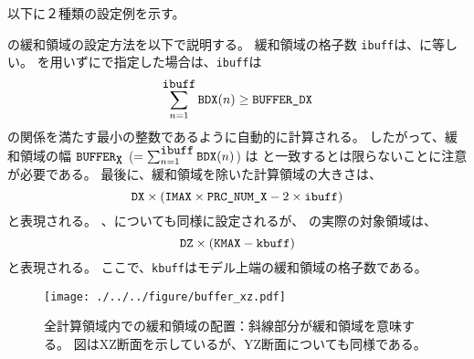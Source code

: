以下に２種類の設定例を示す。
%
%

{\XDIR}の緩和領域の設定方法を以下で説明する。
緩和領域の格子数 \verb|ibuff|は、に等しい。
を用いずにで指定した場合は、\verb|ibuff|は
\[
\sum_{n=1}^{\verb|ibuff|} \verb|BDX|(n) \ge \nmitemeq{BUFFER_DX} \nonumber
\]
の関係を満たす最小の整数であるように自動的に計算される。
したがって、緩和領域の幅 $\verb|BUFFER|_{\verb|X|}$ ($= \sum_{n=1}^{\verb|ibuff|} \verb|BDX|(n)$)
は  と一致するとは限らないことに注意が必要である。
最後に、緩和領域を除いた計算領域の大きさは、
\[
\nmitemeq{DX} \times ( \nmitemeq{IMAX} \times \nmitemeq{PRC_NUM_X} - 2 \times \verb|ibuff| )
\]
と表現される。
{\YDIR}、{\ZDIR}についても同様に設定されるが、
{\ZDIR} の実際の対象領域は、
\[
\nmitemeq{DZ} \times ( \nmitemeq{KMAX} - \verb|kbuff| )
\]
と表現される。
ここで、\verb|kbuff|はモデル上端の緩和領域の格子数である。


\begin{figure}[t]
\begin{center}
  \texttt{[image: ./../../figure/buffer\_xz.pdf]}\\
  \caption{全計算領域内での緩和領域の配置：斜線部分が緩和領域を意味する。
  図はXZ断面を示しているが、YZ断面についても同様である。}
  \label{fig:buff_xz}
\end{center}
\end{figure}

